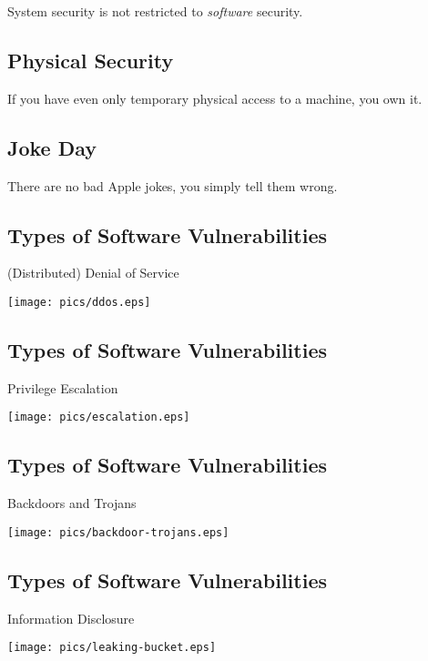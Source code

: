\documentclass[xga]{xdvislides}
\begin{document}
\Huge
\begin{center}
System security is not restricted to {\em software} security.
\end{center}
\Normalsize

\subsection{Physical Security}
\vspace{.5in}

\Huge
\begin{center}
If you have even only temporary physical access to a machine, you own it.
\end{center}
\Normalsize

\subsection{Joke Day}
\vspace*{\fill}
\begin{center}
\Huge
There are no bad Apple jokes, you simply tell them wrong.
\Normalsize
\end{center}
\vspace*{\fill}


\subsection{Types of Software Vulnerabilities}
(Distributed) Denial of Service
\begin{center}
	\texttt{[image: pics/ddos.eps]}
\end{center}

\subsection{Types of Software Vulnerabilities}
Privilege Escalation
\begin{center}
	\texttt{[image: pics/escalation.eps]}
\end{center}

\subsection{Types of Software Vulnerabilities}
Backdoors and Trojans
\begin{center}
	\texttt{[image: pics/backdoor-trojans.eps]}
\end{center}

\subsection{Types of Software Vulnerabilities}
Information Disclosure
\begin{center}
	\texttt{[image: pics/leaking-bucket.eps]}
\end{center}
\end{document}
